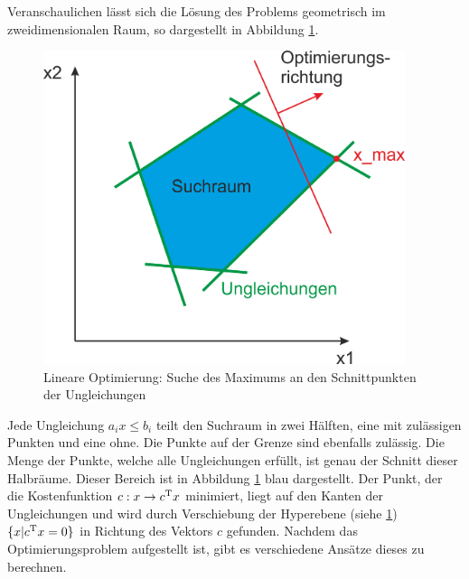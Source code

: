 \documentclass{like}
\begin{document}
Veranschaulichen lässt sich die Lösung des Problems geometrisch im zweidimensionalen Raum, so dargestellt in Abbildung \ref*{fig:linOpt}.

\begin{figure}[ht!]
	\centering
	\includegraphics[width=300pt]{Abbildungen/linearOpt.png}
	\caption{Lineare Optimierung: Suche des Maximums an den Schnittpunkten der Ungleichungen}
	\label{fig:linOpt}
\end{figure}

Jede Ungleichung $a_i x \leq b_i$ teilt den Suchraum in zwei Hälften, eine mit zulässigen Punkten und eine ohne. Die Punkte auf der Grenze sind ebenfalls zulässig. Die Menge der Punkte, welche alle Ungleichungen erfüllt, ist genau der Schnitt dieser Halbräume. Dieser Bereich ist in Abbildung \ref{fig:linOpt} blau dargestellt. Der Punkt, der die Kostenfunktion $c: x \rightarrow c\textsuperscript{T} x$ minimiert, liegt auf den Kanten der Ungleichungen und wird durch Verschiebung der Hyperebene (siehe \ref{fig:linOpt}) $ \{x| c\textsuperscript{T} x = 0 \}$ in Richtung des Vektors \(c\) gefunden. Nachdem das Optimierungsproblem aufgestellt ist, gibt es verschiedene Ansätze dieses zu berechnen.
\end{document}
